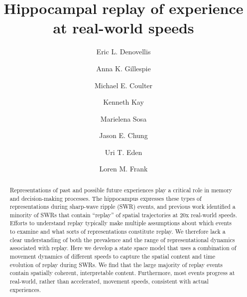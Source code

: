 \documentclass[times, twoside]{zHenriquesLab-StyleBioRxiv}
\begin{document}
\title{Hippocampal replay of experience at real-world speeds}

\author[1]{Eric L. Denovellis}
\author[2, 3]{Anna K. Gillespie}
\author[2, 3]{Michael E. Coulter}
\author[4]{Kenneth Kay}
\author[5]{Marielena Sosa}
\author[6]{Jason E. Chung}
\author[7]{Uri T. Eden}
\author[1, 2, 3, \Letter]{Loren M. Frank}




\maketitle

\begin{abstract}
Representations of past and possible future experiences play a critical role in memory and decision-making processes. The hippocampus expresses these types of representations during sharp-wave ripple (SWR) events, and previous work identified a minority of SWRs that contain “replay” of spatial trajectories at \texttildelow20x real-world speeds. Efforts to understand replay typically make multiple assumptions about which events to examine and what sorts of representations constitute replay. We therefore lack a clear understanding of both the prevalence and the range of representational dynamics associated with replay. Here we develop a state space model that uses a combination of movement dynamics of different speeds to capture the spatial content and time evolution of replay during SWRs. We find that the large majority of replay events contain spatially coherent, interpretable content. Furthermore, most events progress at real-world, rather than accelerated, movement speeds, consistent with actual experiences. 
\end {abstract}
\end{document}
